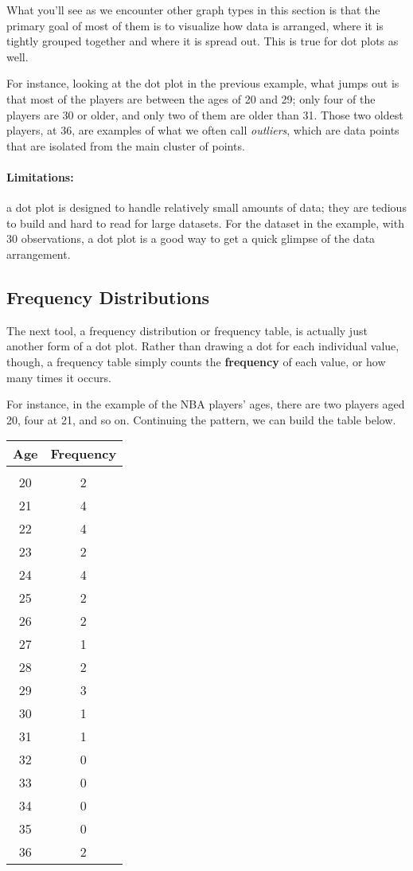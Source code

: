 What you'll see as we encounter other graph types in this section is that the primary goal of most of them is to visualize how data is arranged, where it is tightly grouped together and where it is spread out.  This is true for dot plots as well.

For instance, looking at the dot plot in the previous example, what jumps out is that most of the players are between the ages of 20 and 29; only four of the players are 30 or older, and only two of them are older than 31.  Those two oldest players, at 36, are examples of what we often call \emph{outliers}, which are data points that are isolated from the main cluster of points.

\paragraph{Limitations:} a dot plot is designed to handle relatively small amounts of data; they are tedious to build and hard to read for large datasets.  For the dataset in the example, with 30 observations, a dot plot is a good way to get a quick glimpse of the data arrangement.

\subsection{Frequency Distributions}
The next tool, a frequency distribution or frequency table, is actually just another form of a dot plot.  Rather than drawing a dot for each individual value, though, a frequency table simply counts the \textbf{frequency} of each value, or how many times it occurs.

For instance, in the example of the NBA players' ages, there are two players aged 20, four at 21, and so on.  Continuing the pattern, we can build the table below.
\begin{center}
\begin{tabular}{c c}
\textbf{Age} & \textbf{Frequency}\\
\hline
& \\
20 & 2\\
21 & 4\\
22 & 4\\
23 & 2\\
24 & 4\\
25 & 2\\
26 & 2\\
27 & 1\\
28 & 2\\
29 & 3\\
30 & 1\\
31 & 1\\
32 & 0\\
33 & 0\\
34 & 0\\
35 & 0\\
36 & 2
\end{tabular}
\end{center}

